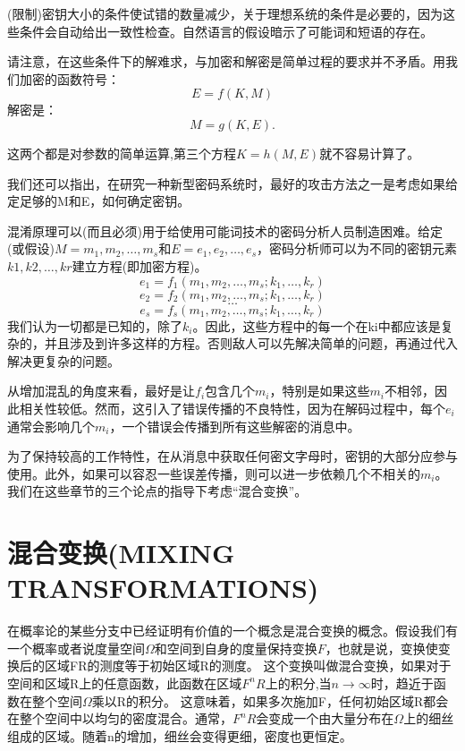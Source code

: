 \documentclass[]{article}
\begin{document}
(限制)密钥大小的条件使试错的数量减少，关于理想系统的条件是必要的，因为这些条件会自动给出一致性检查。自然语言的假设暗示了可能词和短语的存在。

请注意，在这些条件下的解难求，与加密和解密是简单过程的要求并不矛盾。用我们加密的函数符号：
\[E=f(K,M)\]
解密是：
\[M=g(K,E).\]

这两个都是对参数的简单运算,第三个方程$K=h(M,E)$就不容易计算了。

我们还可以指出，在研究一种新型密码系统时，最好的攻击方法之一是考虑如果给定足够的M和E，如何确定密钥。

混淆原理可以(而且必须)用于给使用可能词技术的密码分析人员制造困难。给定(或假设)$M=m_1,m_2,\ldots,m_s$和$E=e_1,e_2,\ldots,e_s$，密码分析师可以为不同的密钥元素$k1,k2,\ldots,kr$建立方程(即加密方程)。
\[e_1=f_1(m_1,m_2,\ldots,m_s;k_1,\ldots,k_r)\]
\[e_2=f_2(m_1,m_2,\ldots,m_s;k_1,\ldots,k_r)\]
\[\ldots\]
\[e_s=f_s(m_1,m_2,\ldots,m_s;k_1,\ldots,k_r)\]
我们认为一切都是已知的，除了$k_i$。因此，这些方程中的每一个在ki中都应该是复杂的，并且涉及到许多这样的方程。否则敌人可以先解决简单的问题，再通过代入解决更复杂的问题。

从增加混乱的角度来看，最好是让$f_i$包含几个$m_i$，特别是如果这些$m_i$不相邻，因此相关性较低。然而，这引入了错误传播的不良特性，因为在解码过程中，每个$e_i$通常会影响几个$m_i$，一个错误会传播到所有这些解密的消息中。

为了保持较高的工作特性，在从消息中获取任何密文字母时，密钥的大部分应参与使用。此外，如果可以容忍一些误差传播，则可以进一步依赖几个不相关的$m_i$。我们在这些章节的三个论点的指导下考虑“混合变换”。

\newpage
%   
%


\section{混合变换(MIXING TRANSFORMATIONS)}

在概率论的某些分支中已经证明有价值的一个概念是混合变换的概念。假设我们有一个概率或者说度量空间$\Omega$和空间到自身的度量保持变换$F$，也就是说，变换使变换后的区域FR的测度等于初始区域R的测度。
这个变换叫做混合变换，如果对于空间和区域R上的任意函数，此函数在区域$F^{n}R$上的积分,当$n\rightarrow \infty$时，趋近于函数在整个空间$\Omega$乘以R的积分。
这意味着，如果多次施加F，任何初始区域R都会在整个空间中以均匀的密度混合。通常，$F^{n}R$会变成一个由大量分布在$\Omega$上的细丝组成的区域。随着n的增加，细丝会变得更细，密度也更恒定。
\end{document}
